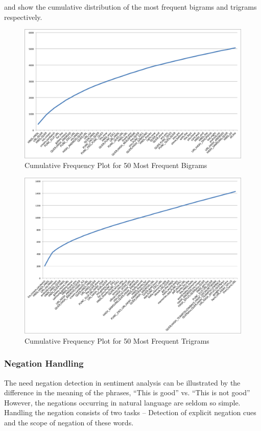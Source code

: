  and  show the cumulative distribution of the most frequent bigrams and trigrams respectively.

\begin{figure}[h!]
\centering
\includegraphics[width=\textwidth]{img/2grams.png}
\caption{Cumulative Frequency Plot for 50 Most Frequent Bigrams}
\label{fig:2grams}
\end{figure}

\begin{figure}[h!]
\centering
\includegraphics[width=\textwidth]{img/3grams.png}
\caption{Cumulative Frequency Plot for 50 Most Frequent Trigrams}
\label{fig:3grams}
\end{figure}

\subsubsection{Negation Handling} The need negation detection in sentiment
analysis can be illustrated by the difference in the meaning of the phrases,
``This is good'' vs. ``This is not good'' However, the negations occurring in
natural language are seldom so simple. Handling the negation consists of two
tasks – Detection of explicit negation cues and the scope of negation of these
words.

